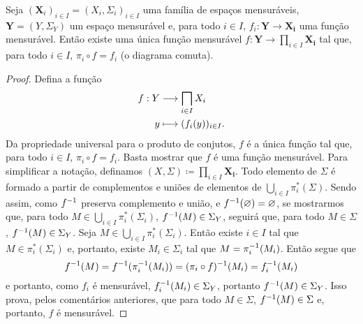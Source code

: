 \begin{prop}
Seja $(\bm X_i)_{i \in I} = (X_i,\Sigma_i)_{i \in I}$ uma família de espaços mensuráveis, $\bm Y = (Y,\Sigma_Y)$ um espaço mensurável e, para todo $i \in I$, $f_i: \bm Y \to \bm{X_i}$ uma função mensurável. Então existe uma única função mensurável $f: \bm Y \to \prod_{i \in I} \bm{X_i}$ tal que, para todo $i \in I$, $\pi_i \circ f = f_i$ (o diagrama comuta).
\begin{figure}
\centering
{}
\end{figure}
\end{prop}
\begin{proof}
Defina a função
	\begin{align*}
	\func{f}{Y}{\prod_{i \in I} X_i}{y}{(f_i(y))_{i \in I}}.
	\end{align*}
Da propriedade universal para o produto de conjutos, $f$ é a única função tal que, para todo $i \in I$, $\pi_i \circ f = f_i$. Basta mostrar que $f$ é uma função mensurável. Para simplificar a notação, definamos $(X,\Sigma) \coloneqq \prod_{i \in I} \bm{X_i}$. Todo elemento de $\Sigma$ é formado a partir de complementos e uniões de elementos de $\bigcup_{i \in I} \pi_i^*(\Sigma)$. Sendo assim, como $f^{-1}$ preserva complemento e união, e $f^{-1}(\varnothing)=\varnothing$, se mostrarmos que, para todo $M \in \bigcup_{i \in I} \pi_i^*(\Sigma_i)$, $f^{-1}(M) \in \Sigma_Y$, seguirá que, para todo $M \in \Sigma$, $f^{-1}(M) \in \Sigma_Y$. Seja $M \in \bigcup_{i \in I} \pi_i^*(\Sigma_i)$. Então existe $i \in I$ tal que $M \in \pi_i^*(\Sigma_i)$ e, portanto, existe $M_i \in \Sigma_i$ tal que $M=\pi_i^{-1}(M_i)$. Então segue que
	\begin{equation*}
	f^{-1}(M) = f^{-1}(\pi_i^{-1}(M_i)) = (\pi_i \circ f)^{-1}(M_i) = f_i^{-1}(M_i)
	\end{equation*}
e portanto, como $f_i$ é mensurável, $f_i^{-1}(M_i) \in \Sigma_Y$, portanto $f^{-1}(M) \in \Sigma_Y$. Isso prova, pelos comentários anteriores, que para todo $M \in \Sigma$, $f^{-1}(M) \in \Sigma$ e, portanto, $f$ é mensurável.
\end{proof}







